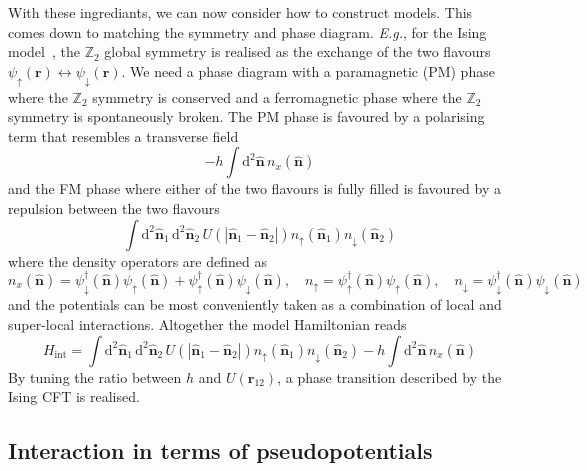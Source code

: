 \documentclass{timesjhep}
\begin{document}
With these ingrediants, we can now consider how to construct models. This comes down to matching the symmetry and phase diagram. \textit{E.g.}, for the Ising model~\cite{Zhu2022}, the $\mathbb{Z}_2$ global symmetry is realised as the exchange of the two flavours $\psi_\uparrow(\mathbf{r})\leftrightarrow\psi_\downarrow(\mathbf{r})$. We need a phase diagram with a paramagnetic (PM) phase where the $\mathbb{Z}_2$ symmetry is conserved and a ferromagnetic phase where the $\mathbb{Z}_2$ symmetry is spontaneously broken. The PM phase is favoured by a polarising term that resembles a transverse field
\begin{equation*}
    -h\int\mathrm{d}^2\hat{\mathbf{n}}\,n_x(\hat{\mathbf{n}})
\end{equation*}
and the FM phase where either of the two flavours is fully filled is favoured by a repulsion between the two flavours 
\begin{equation*}
    \int\mathrm{d}^2\hat{\mathbf{n}}_1\,\mathrm{d}^2\hat{\mathbf{n}}_2\,U(|\hat{\mathbf{n}}_1-\hat{\mathbf{n}}_2|)n_\uparrow(\hat{\mathbf{n}}_1)n_\downarrow(\hat{\mathbf{n}}_2) 
\end{equation*} 
where the density operators are defined as 
\begin{equation*}
    n_x(\hat{\mathbf{n}})=\psi^\dagger_\downarrow(\hat{\mathbf{n}})\psi_\uparrow(\hat{\mathbf{n}})+\psi^\dagger_\uparrow(\hat{\mathbf{n}})\psi_\downarrow(\hat{\mathbf{n}}),\quad n_\uparrow=\psi^\dagger_\uparrow(\hat{\mathbf{n}})\psi_\uparrow(\hat{\mathbf{n}}),\quad n_\downarrow=\psi^\dagger_\downarrow(\hat{\mathbf{n}})\psi_\downarrow(\hat{\mathbf{n}}) 
\end{equation*}
and the potentials can be most conveniently taken as a combination of local and super-local interactions. Altogether the model Hamiltonian reads 
\begin{equation}
    H_\mathrm{int}=\int\mathrm{d}^2\hat{\mathbf{n}}_1\,\mathrm{d}^2\hat{\mathbf{n}}_2\,U(|\hat{\mathbf{n}}_1-\hat{\mathbf{n}}_2|)n_↑(\hat{\mathbf{n}}_1)n_\downarrow(\hat{\mathbf{n}}_2)-h\int\mathrm{d}^2\hat{\mathbf{n}}\,n_x(\hat{\mathbf{n}})
    \label{eq:ising_hmt}
\end{equation}
By tuning the ratio between $h$ and $U(\mathbf{r}_{12})$, a phase transition described by the Ising CFT is realised. 

\subsection{Interaction in terms of pseudopotentials}
\label{sec:construct_pspot}
\end{document}
